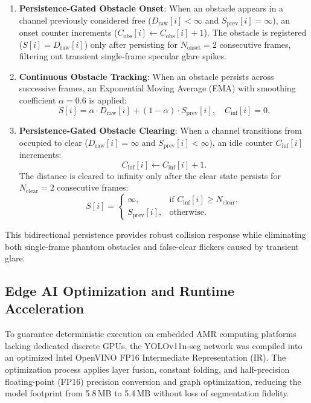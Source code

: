 \documentclass{ieeeaccess}
\begin{document}
\begin{enumerate}
  \item \textbf{Persistence-Gated Obstacle Onset}: When an obstacle appears in a channel previously considered free ($D_{\mathrm{raw}}[i] < \infty$ and $S_{\mathrm{prev}}[i] = \infty$), an onset counter increments ($C_{\mathrm{obs}}[i] \gets C_{\mathrm{obs}}[i] + 1$). The obstacle is registered ($S[i] = D_{\mathrm{raw}}[i]$) only after persisting for $N_{\mathrm{onset}} = 2$ consecutive frames, filtering out transient single-frame specular glare spikes.
  \item \textbf{Continuous Obstacle Tracking}: When an obstacle persists across successive frames, an Exponential Moving Average (EMA) with smoothing coefficient $\alpha = 0.6$ is applied:
  \begin{equation}
    S[i] = \alpha \cdot D_{\mathrm{raw}}[i] + (1 - \alpha) \cdot S_{\mathrm{prev}}[i], \quad C_{\mathrm{inf}}[i] = 0.
  \end{equation}
  \item \textbf{Persistence-Gated Obstacle Clearing}: When a channel transitions from occupied to clear ($D_{\mathrm{raw}}[i] = \infty$ and $S_{\mathrm{prev}}[i] < \infty$), an idle counter $C_{\mathrm{inf}}[i]$ increments:
  \begin{equation}
    C_{\mathrm{inf}}[i] \gets C_{\mathrm{inf}}[i] + 1.
  \end{equation}
  The distance is cleared to infinity only after the clear state persists for $N_{\mathrm{clear}} = 2$ consecutive frames:
  \begin{equation}
    S[i] = \begin{cases} \infty, & \text{if } C_{\mathrm{inf}}[i] \ge N_{\mathrm{clear}}, \\ S_{\mathrm{prev}}[i], & \text{otherwise.} \end{cases}
  \end{equation}
\end{enumerate}
This bidirectional persistence provides robust collision response while eliminating both single-frame phantom obstacles and false-clear flickers caused by transient glare.

\subsection{Edge AI Optimization and Runtime Acceleration}
\label{subsec:edge_acceleration}
To guarantee deterministic execution on embedded AMR computing platforms lacking dedicated discrete GPUs, the YOLOv11n-seg network was compiled into an optimized Intel OpenVINO FP16 Intermediate Representation (IR). The optimization process applies layer fusion, constant folding, and half-precision floating-point (FP16) precision conversion and graph optimization, reducing the model footprint from 5.8\,MB to 5.4\,MB without loss of segmentation fidelity.
\end{document}

